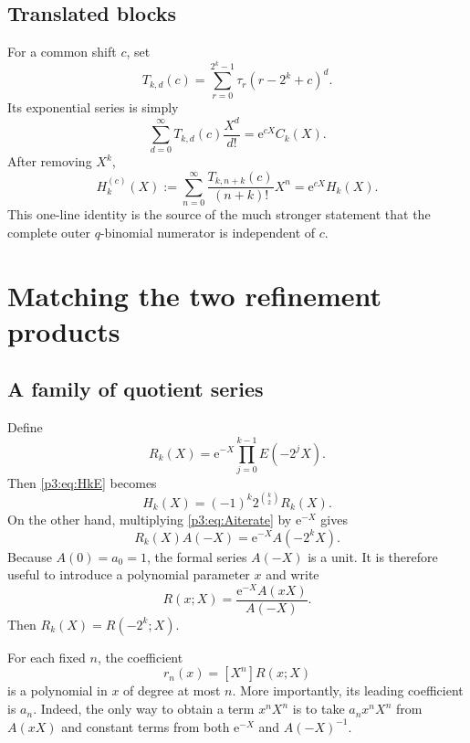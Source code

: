 \documentclass[11pt,oneside]{article}
\theoremstyle{definition}
\theoremstyle{remark}
\newcommand{\coeff}[2]{\left[#1^{#2}\right]}
\newcommand{\e}{\mathrm e}
\newcommand{\tm}{\tau}
\begin{document}
\subsection{Translated blocks}

For a common shift $c$, set
\begin{equation}\label{p3:eq:Ttrans}
 T_{k,d}(c)=\sum_{r=0}^{2^k-1}\tm_r(r-2^k+c)^d.
\end{equation}
Its exponential series is simply
\begin{equation}\label{p3:eq:Ctrans}
 \sum_{d=0}^{\infty}T_{k,d}(c)\frac{X^d}{d!}
 =\e^{cX}C_k(X).
\end{equation}
After removing $X^k$,
\begin{equation}\label{p3:eq:Htrans}
 H_k^{(c)}(X)
 :=\sum_{n=0}^{\infty}\frac{T_{k,n+k}(c)}{(n+k)!}X^n
 =\e^{cX}H_k(X).
\end{equation}
This one-line identity is the source of the much stronger statement that the complete outer $q$-binomial numerator is independent of $c$.

\section{Matching the two refinement products}

\subsection{A family of quotient series}

Define
\begin{equation}\label{p3:eq:Rkdef}
 R_k(X)=\e^{-X}\prod_{j=0}^{k-1}E(-2^jX).
\end{equation}
Then \eqref{p3:eq:HkE} becomes
\begin{equation}\label{p3:eq:HkRk}
 H_k(X)=(-1)^k2^{\binom{k}{2}}R_k(X).
\end{equation}
On the other hand, multiplying \eqref{p3:eq:Aiterate} by $\e^{-X}$ gives
\begin{equation}\label{p3:eq:RkA}
 \boxed{
 R_k(X)A(-X)=\e^{-X}A(-2^kX).}
\end{equation}
Because $A(0)=a_0=1$, the formal series $A(-X)$ is a unit.  It is therefore useful to introduce a polynomial parameter $x$ and write
\begin{equation}\label{p3:eq:Rparam}
 R(x;X)=\frac{\e^{-X}A(xX)}{A(-X)}.
\end{equation}
Then $R_k(X)=R(-2^k;X)$.

For each fixed $n$, the coefficient
\begin{equation}\label{p3:eq:rnpoly}
 r_n(x)=\coeff{X}{n}R(x;X)
\end{equation}
is a polynomial in $x$ of degree at most $n$.  More importantly, its leading coefficient is $a_n$.  Indeed, the only way to obtain a term $x^nX^n$ is to take $a_nx^nX^n$ from $A(xX)$ and constant terms from both $\e^{-X}$ and $A(-X)^{-1}$.
\end{document}
